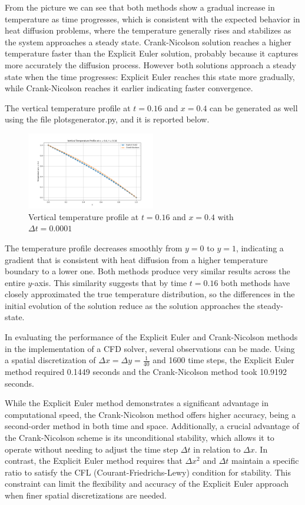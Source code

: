 \documentclass{article}
\begin{document}
From the picture we can see that both methods show a gradual increase in temperature as time progresses, which is consistent with the expected behavior in heat diffusion problems, where the temperature generally rises and stabilizes as the system approaches a steady state.
Crank-Nicolson solution reaches a higher temperature faster than the Explicit Euler solution, probably because it captures more accurately the diffusion process. 
However both solutions approach a steady state when the time progresses: Explicit Euler reaches this state more gradually, while Crank-Nicolson reaches it earlier indicating faster convergence.

The vertical temperature profile at $t = 0.16$ and $x = 0.4$ can be generated as well using the file plotsgenerator.py, and it is reported below.
\begin{figure}[h]
\centering
\includegraphics[width=0.5\textwidth]{final_temperature_along_a_line0-0001.png}
\caption{Vertical temperature profile at $t = 0.16$ and $x = 0.4$ with $\Delta t = 0.0001$}
\label{fig: vertical temperature}
\end{figure}

The temperature profile decreases smoothly from $y = 0$ to $y = 1$, indicating a gradient that is consistent with heat diffusion from a higher temperature boundary to a lower one.
Both methods produce very similar results across the entire $y$-axis. This similarity suggests that by time $t = 0.16$ both methods have closely approximated the true temperature distribution, so the differences in the initial evolution of the solution reduce as the solution approaches the steady-state.

In evaluating the performance of the Explicit Euler and Crank-Nicolson methods in the implementation of a CFD solver, several observations can be made. Using a spatial discretization of 
$\Delta x = \Delta y = \frac{1}{40}$ and 1600 time steps, the Explicit Euler method required 0.1449 seconds and the Crank-Nicolson method took 10.9192 seconds.

While the Explicit Euler method demonstrates a significant advantage in computational speed, the Crank-Nicolson method offers higher accuracy, being a second-order method in both time and space. Additionally, a crucial advantage of the Crank-Nicolson scheme is its unconditional stability, which allows it to operate without needing to adjust the time step 
$ \Delta t$ in relation to $\Delta x$. In contrast, the Explicit Euler method requires that $\Delta x^2$ and $\Delta t$ maintain a specific ratio to satisfy the CFL (Courant-Friedrichs-Lewy) condition for stability. This constraint can limit the flexibility and accuracy of the Explicit Euler approach when finer spatial discretizations are needed.
\end{document}
